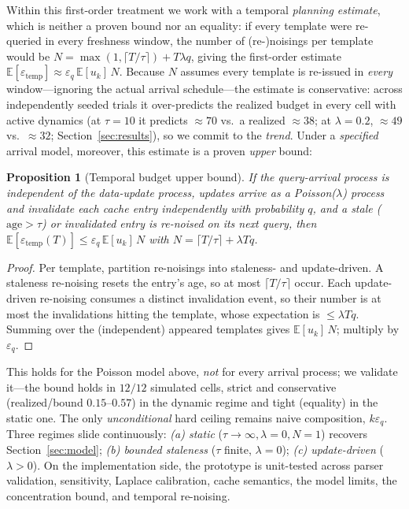 \documentclass[sigconf,nonacm]{acmart}
\newcommand{\eps}{\varepsilon}
\newcommand{\E}{\mathbb{E}}
\newtheorem{prop}{Proposition}
\begin{document}
Within this first-order treatment we work with a temporal \emph{planning estimate}, which is neither a proven bound nor an equality: if every template were re-queried in every freshness window, the number of (re-)noisings per template would be $N=\max(1,\lceil T/\tau\rceil)+T\lambda q$, giving the first-order estimate $\E[\eps_{\mathrm{temp}}]\approx\eps_q\,\E[u_k]\,N$. Because $N$ assumes every template is re-issued in \emph{every} window---ignoring the actual arrival schedule---the estimate is conservative: across independently seeded trials it over-predicts the realized budget in every cell with active dynamics (at $\tau{=}10$ it predicts ${\approx}70$ vs.\ a realized ${\approx}38$; at $\lambda{=}0.2$, ${\approx}49$ vs.\ ${\approx}32$; Section~\ref{sec:results}), so we commit to the \emph{trend}. Under a \emph{specified} arrival model, moreover, this estimate is a proven \emph{upper} bound:
\begin{prop}[Temporal budget upper bound]\label{prop:tempbound}
If the query-arrival process is independent of the data-update process, updates arrive as a Poisson($\lambda$) process and invalidate each cache entry independently with probability $q$, and a stale ($\mathrm{age}>\tau$) or invalidated entry is re-noised on its next query, then
$\E[\eps_{\mathrm{temp}}(T)]\le\eps_q\,\E[u_k]\,N$ with $N=\lceil T/\tau\rceil+\lambda T q$.
\end{prop}
\begin{proof}
Per template, partition re-noisings into staleness- and update-driven. A staleness re-noising resets the entry's age, so at most $\lceil T/\tau\rceil$ occur. Each update-driven re-noising consumes a distinct invalidation event, so their number is at most the invalidations hitting the template, whose expectation is $\le\lambda Tq$. Summing over the (independent) appeared templates gives $\E[u_k]\,N$; multiply by $\eps_q$. \end{proof}
\noindent This holds for the Poisson model above, \emph{not} for every arrival process; we validate it---the bound holds in $12/12$ simulated cells, strict and conservative (realized/bound $0.15$--$0.57$) in the dynamic regime and tight (equality) in the static one. The only \emph{unconditional} hard ceiling remains naive composition, $k\eps_q$. Three regimes slide continuously: \emph{(a) static} ($\tau\to\infty,\lambda{=}0,N{=}1$) recovers Section~\ref{sec:model}; \emph{(b) bounded staleness} ($\tau$ finite, $\lambda{=}0$); \emph{(c) update-driven} ($\lambda{>}0$). On the implementation side, the prototype is unit-tested across parser validation, sensitivity, Laplace calibration, cache semantics, the model limits, the concentration bound, and temporal re-noising.
\end{document}
